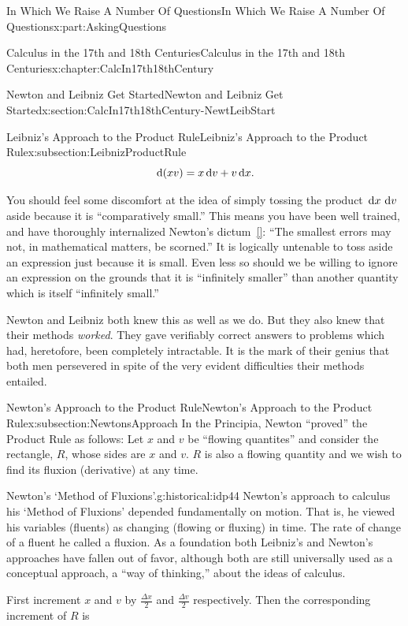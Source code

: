 \documentclass[oneside,10pt,]{book}
\newcommand{\xreffont}{\relax}
\numberwithin{equation}{section}
\newcommand{\dx}[1]{\,{\rm d}#1}
\begin{document}
\begin{partptx}{In Which We Raise A Number Of Questions}{}{In Which We Raise A Number Of Questions}{}{}{x:part:AskingQuestions}
\begin{chapterptx}{Calculus in the 17th and 18th Centuries}{}{Calculus in the 17th and 18th Centuries}{}{}{x:chapter:CalcIn17th18thCentury}
\begin{sectionptx}{Newton and Leibniz Get Started}{}{Newton and Leibniz Get Started}{}{}{x:section:CalcIn17th18thCentury-NewtLeibStart}
\begin{subsectionptx}{Leibniz's Approach to the Product Rule}{}{Leibniz's Approach to the Product Rule}{}{}{x:subsection:LeibnizProductRule}
\begin{equation*}
\dx{ (xv)}=x\dx{ v}+v\dx{ x}\text{.}
\end{equation*}
%
\par
You should feel some discomfort at the idea of simply tossing the product \(\dx{ x}\,\dx{ v}\) aside because it is ``comparatively small.'' This means you have been well trained, and have thoroughly internalized Newton's  dictum~\hyperlink{x:biblio:newton45__sir_isaac_two_treat_quadr}{[{\xreffont 10}]}: ``The smallest errors may not, in mathematical matters, be scorned.'' It is logically untenable to toss aside an expression just because it is small.  Even less so should we be willing to ignore an expression on the grounds that it is ``infinitely smaller'' than another quantity which is itself ``infinitely small.''%
\par
Newton and Leibniz both knew this as well as we do.  But they also knew that their methods \emph{worked}.  They gave verifiably correct answers to problems which had, heretofore, been completely intractable.  It is the mark of their genius that both men persevered in spite of the very evident difficulties their methods entailed.%
\end{subsectionptx}
%
%
\typeout{************************************************}
\typeout{************************************************}
%
\begin{subsectionptx}{Newton's Approach to the Product Rule}{}{Newton's Approach to the Product Rule}{}{}{x:subsection:NewtonsApproach}
In the Principia, Newton ``proved'' the Product Rule as follows: Let \(x\) and \(v\) be ``flowing quantites'' and consider the rectangle, \(R\), whose sides are \(x\) and \(v\).  \(R\) is also a flowing quantity and we wish to find its fluxion (derivative) at any time.%
\begin{historical}{Newton's `Method of Fluxions'.}{g:historical:idp44}%
Newton's approach to calculus \textemdash{} his `Method of Fluxions' \textemdash{} depended fundamentally on motion. That is, he viewed his variables (fluents) as changing (flowing or fluxing) in time.  The rate of change of a fluent he called a fluxion.  As a foundation both Leibniz's and Newton's approaches have fallen out of favor, although both are still universally used as a conceptual approach, a ``way of thinking,'' about the ideas of calculus.%
\end{historical}
First increment \(x\) and \(v\) by \(\frac{\Delta x}{2}\) and \(\frac{\Delta v}{2}\) respectively. Then the corresponding increment of \(R\) is%

\end{subsectionptx}
\end{sectionptx}
\end{chapterptx}
\end{partptx}
\end{document}
